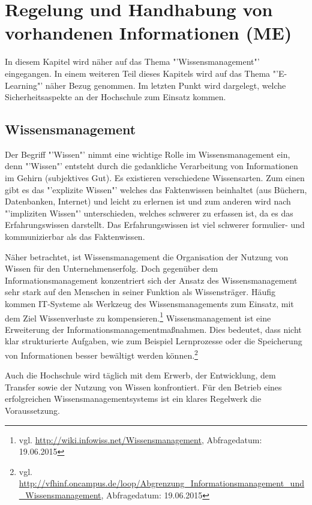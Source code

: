 \section{Regelung und Handhabung von vorhandenen Informationen (ME)}

In diesem Kapitel wird näher auf das Thema "'Wissensmanagement"' eingegangen. In einem weiteren Teil dieses Kapitels wird auf das Thema "'E-Learning"' näher Bezug genommen. Im letzten Punkt wird dargelegt, welche Sicherheitsaspekte an der Hochschule zum Einsatz kommen.

\subsection{Wissensmanagement}

Der Begriff "'Wissen"' nimmt eine wichtige Rolle im Wissensmanagement ein, denn "'Wissen"' entsteht durch die gedankliche Verarbeitung von Informationen im Gehirn (subjektives Gut). Es existieren verschiedene Wissensarten. Zum einen gibt es das "'explizite Wissen"' welches das Faktenwissen beinhaltet (aus Büchern, Datenbanken, Internet) und leicht zu erlernen ist und zum anderen wird nach "'impliziten Wissen"' unterschieden, welches schwerer zu erfassen ist, da es das Erfahrungswissen darstellt. Das Erfahrungswissen ist viel schwerer formulier- und kommunizierbar als das Faktenwissen. 

Näher betrachtet, ist Wissensmanagement die Organisation der Nutzung von Wissen für den Unternehmenserfolg. Doch gegenüber dem Informationsmanagement konzentriert sich der Ansatz des Wissensmanagement sehr stark auf den Menschen in seiner Funktion als Wissensträger. Häufig kommen IT-Systeme als Werkzeug des Wissensmanagements zum Einsatz, mit dem Ziel Wissenverluste zu kompensieren.\footnote{vgl. \url{http://wiki.infowiss.net/Wissensmanagement}, Abfragedatum: 19.06.2015}  Wissensmanagement ist eine Erweiterung der Informationsmanagementmaßnahmen. Dies bedeutet, dass nicht klar strukturierte Aufgaben, wie zum Beispiel Lernprozesse oder die Speicherung von Informationen besser bewältigt werden können.\footnote{vgl. \url{http://vfhinf.oncampus.de/loop/Abgrenzung_Informationsmanagement_und_Wissensmanagement}, Abfragedatum: 19.06.2015} 

Auch die Hochschule wird täglich mit dem Erwerb, der Entwicklung, dem Transfer sowie der Nutzung von Wissen konfrontiert. Für den Betrieb eines erfolgreichen Wissensmanagementsystems ist ein klares Regelwerk die Voraussetzung. 

